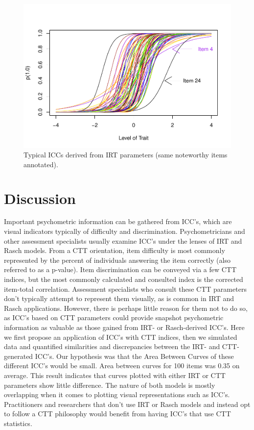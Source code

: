 \documentclass[
  man]{apa6}
\begin{document}
\begin{figure}
\centering
\includegraphics{ICC_project_files/figure-latex/irtcurves-1.pdf}
\caption{\label{fig:irtcurves}Typical ICCs derived from IRT parameters (same noteworthy items annotated).}
\end{figure}

\hypertarget{discussion}{%
\section{Discussion}\label{discussion}}

Important psychometric information can be gathered from ICC's, which are visual indicators typically of difficulty and discrimination. Psychometricians and other assessment specialists usually examine ICC's under the lenses of IRT and Rasch models. From a CTT orientation, item difficulty is most commonly represented by the percent of individuals answering the item correctly (also referred to as a p-value). Item discrimination can be conveyed via a few CTT indices, but the most commonly calculated and consulted index is the corrected item-total correlation. Assessment specialists who consult these CTT parameters don't typically attempt to represent them visually, as is common in IRT and Rasch applications. However, there is perhaps little reason for them not to do so, as ICC's based on CTT parameters could provide snapshot psychometric information as valuable as those gained from IRT- or Rasch-derived ICC's. Here we first propose an application of ICC's with CTT indices, then we simulated data and quantified similarities and discrepancies between the IRT- and CTT-generated ICC's. Our hypothesis was that the Area Between Curves of these different ICC's would be small. Area between curves for 100 items was 0.35 on average. This result indicates that curves plotted with either IRT or CTT parameters show little difference. The nature of both models is mostly overlapping when it comes to plotting visual representations such as ICC's. Practitioners and researchers that don't use IRT or Rasch models and instead opt to follow a CTT philosophy would benefit from having ICC's that use CTT statistics.
\end{document}
